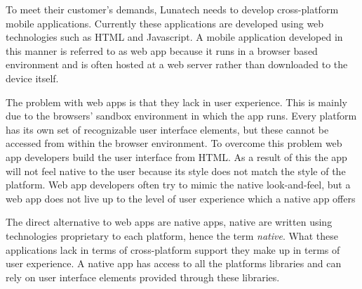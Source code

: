 

To meet their customer's demands, Lunatech needs to develop cross-platform mobile applications. Currently these applications are developed using web technologies such as HTML and Javascript. A mobile application developed in this manner is referred to as web app because it runs in a browser based environment and is often hosted at a web server rather than downloaded to the device itself.




The problem with web apps is that they lack in user experience. This is mainly due to the browsers' sandbox environment in which the app runs. Every platform has its own set of recognizable user interface elements, but these cannot be accessed from within the browser environment. To overcome this problem web app developers build the user interface from HTML.  As a result of this the app will not feel native to the user because its style does not match the style of the platform. Web app developers often try to mimic the native look-and-feel, but a web app does not live up to the level of user experience which a native app offers


The direct alternative to web apps are native apps, native are written using technologies proprietary to each platform, hence the term \emph{native}. What these applications lack in terms of cross-platform support they make up in terms of user experience.  A native app has access to all the platforms libraries and can rely on user interface elements provided through these libraries.

